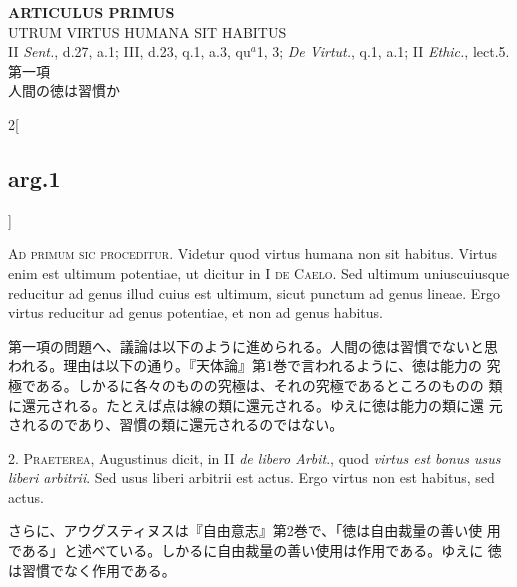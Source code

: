 \documentclass[paper=a4paper,fontsize=10pt,jafontsize=9pt,titlepage]{jlreq}
\begin{document}
\newpage
{}
{}
\setcounter{section}{1}
\setcounter{subsection}{0}

\begin{center}
{\Large {\bfseries ARTICULUS PRIMUS}}\\
{\large UTRUM VIRTUS HUMANA SIT HABITUS}\\
{\footnotesize II {\itshape Sent.}, d.27, a.1; III, d.23, q.1, a.3, qu$^{a}$1, 3; {\itshape De Virtut.}, q.1, a.1; II {\itshape Ethic.}, lect.5.}\\
{\Large 第一項\\人間の徳は習慣か}
\end{center}

\begin{paracol}{2}[\subsection{arg.1}]

{\scshape Ad primum sic proceditur}. Videtur quod virtus humana non
sit habitus. Virtus enim est ultimum potentiae, ut dicitur in I
{\scshape de Caelo}. Sed ultimum uniuscuiusque reducitur ad genus
illud cuius est ultimum, sicut punctum ad genus lineae. Ergo virtus
reducitur ad genus potentiae, et non ad genus habitus.

\switchcolumn

第一項の問題へ、議論は以下のように進められる。人間の徳は習慣でないと思
われる。理由は以下の通り。『天体論』第1巻で言われるように、徳は能力の
究極である。しかるに各々のものの究極は、それの究極であるところのものの
類に還元される。たとえば点は線の類に還元される。ゆえに徳は能力の類に還
元されるのであり、習慣の類に還元されるのではない。


2. {\scshape Praeterea}, Augustinus dicit, in II {\itshape de libero
Arbit}., quod {\itshape virtus est bonus usus liberi arbitrii}. Sed
usus liberi arbitrii est actus. Ergo virtus non est habitus, sed
actus.

\switchcolumn

さらに、アウグスティヌスは『自由意志』第2巻で、「徳は自由裁量の善い使
用である」と述べている。しかるに自由裁量の善い使用は作用である。ゆえに
徳は習慣でなく作用である。



\end{paracol}
\end{document}
